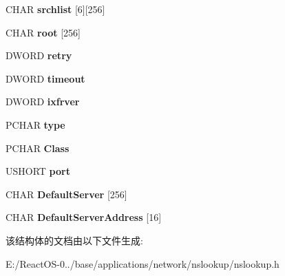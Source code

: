 \begin{DoxyCompactItemize}
C\+H\+AR {\bfseries srchlist} \mbox{[}6\mbox{]}\mbox{[}256\mbox{]}
\item 
\mbox{\label{struct___s_t_a_t_e_a14e6f6de379ceae72e9cbf50d5f7ca40}} 
C\+H\+AR {\bfseries root} \mbox{[}256\mbox{]}
\item 
\mbox{\label{struct___s_t_a_t_e_acbab22e43b6244ddea4f8e9f364c84fe}} 
D\+W\+O\+RD {\bfseries retry}
\item 
\mbox{\label{struct___s_t_a_t_e_af36abe9605342278f671474a9c6593d3}} 
D\+W\+O\+RD {\bfseries timeout}
\item 
\mbox{\label{struct___s_t_a_t_e_a9f80a373ba601bf39d6f5d10a36f5d35}} 
D\+W\+O\+RD {\bfseries ixfrver}
\item 
\mbox{\label{struct___s_t_a_t_e_aff5a7e24be9429a630e80c0167dbf81e}} 
P\+C\+H\+AR {\bfseries type}
\item 
\mbox{\label{struct___s_t_a_t_e_af0f1c9a7e282862fb4f4e5ec10cf9ecf}} 
P\+C\+H\+AR {\bfseries Class}
\item 
\mbox{\label{struct___s_t_a_t_e_a724871160fa4c874c7bf298256c38559}} 
U\+S\+H\+O\+RT {\bfseries port}
\item 
\mbox{\label{struct___s_t_a_t_e_af1ed62aa90d9619c5eb81b8b6e4197a7}} 
C\+H\+AR {\bfseries Default\+Server} \mbox{[}256\mbox{]}
\item 
\mbox{\label{struct___s_t_a_t_e_ab883ece5832da756720d391890aeeddf}} 
C\+H\+AR {\bfseries Default\+Server\+Address} \mbox{[}16\mbox{]}
\end{DoxyCompactItemize}


该结构体的文档由以下文件生成\+:\begin{DoxyCompactItemize}
\item 
E\+:/\+React\+O\+S-\/0../base/applications/network/nslookup/nslookup.\+h\end{DoxyCompactItemize}

